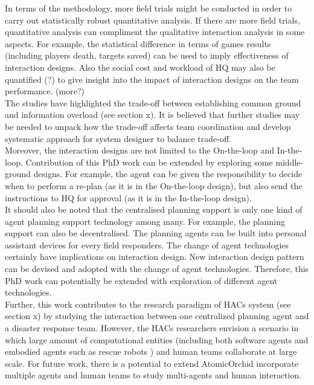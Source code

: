 In terms of the methodology, more field trials might be conducted in order to carry out statistically robust quantitative analysis. If there are more field trials, quantitative analysis can compliment the qualitative interaction analysis in some aspects. For example, the statistical difference in terms of games results (including players death, targets saved) can be used to imply effectiveness of interaction designs. Also the social cost and workload of HQ may also be quantified (?) to give insight into the impact of interaction designs on the team performance. (more?)\\

The studies have highlighted the trade-off between establishing common ground and information overload (see section x). It is believed that further studies may be needed to unpack  how the trade-off affects team coordination and develop systematic approach for system designer to balance trade-off. \\  

Moreover, the interaction designs are not limited to the On-the-loop and In-the-loop. Contribution of this PhD work can be extended by exploring some middle-ground designs. For example, the agent can be given the responsibility to decide when to perform a re-plan (as it is in the On-the-loop design), but also send the instructions to HQ for approval (as it is in the In-the-loop design).\\

It should also be noted that the centralised planning support is only one kind of agent planning support technology among many. For example, the planning support can also be decentralised. The planning agents can be built into personal assistant devices for every field responders. The change of agent technologies certainly have implications on interaction design. New interaction design pattern can be devised and adopted with the change of agent technologies. Therefore, this PhD work can potentially be extended with exploration of different agent technologies.\\ 

Further, this work contributes to the research paradigm of HACs system (see section x) by studying the interaction between one centralized planning agent and a disaster response team. However, the HACs researchers envision a scenario in which large amount of computational entities (including both software agents and embodied agents such as rescue robots ) and human teams collaborate at large scale. For future work, there is a potential to extend AtomicOrchid incorporate multiple agents and human teams to study multi-agents and human interaction.\\




